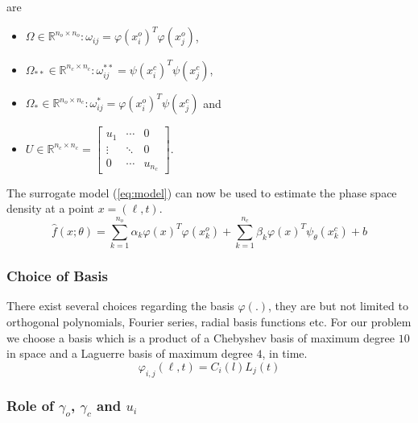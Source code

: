 are 
%
\begin{itemize}
\item $\Omega \in \mathbb{R}^{n_{o} \times n_{o}}: \omega_{ij} = \varphi(x^{o}_{i})^{T} \varphi(x^{o}_{j})$,
\item $\Omega_{**} \in \mathbb{R}^{n_{c} \times n_{c}}: \omega^{**}_{ij} = \psi(x^{c}_{i})^{T} \psi(x^{c}_{j})$,
\item $\Omega_{*} \in \mathbb{R}^{n_{o} \times n_{c}}: \omega^{*}_{ij} = \varphi(x^{o}_{i})^{T} \psi(x^{c}_{j})$ and 
\item $U \in \mathbb{R}^{n_{c} \times n_{c}} = \begin{bmatrix}
    u_1 & \cdots & 0 \\ 
    \vdots & \ddots  & 0\\ 
    0 & \cdots  & u_{n_{c}} 
  \end{bmatrix}$.
\end{itemize}
%
The surrogate model (\cref{eq:model}) can now be used to estimate the phase space density at a 
point $x = (\ell,t)$.
%
\begin{equation}\label{eq:model}
\hat{f}(x;\theta) = 
  \sum_{k = 1}^{n_{o}}{\alpha_{k}\varphi(x)^{T}\varphi(x^{o}_{k}) + 
  \sum_{k = 1}^{n_{c}}}{\beta_{k} \varphi(x)^{T} \psi_{\theta}(x^{c}_{k})} + b
\end{equation}

\subsubsection*{Choice of Basis}

There exist several choices regarding the basis $\varphi(.)$, they are but not limited to 
orthogonal polynomials, Fourier series, radial basis functions etc. For our problem we choose a 
basis which is a product of a Chebyshev basis of maximum degree $10$ in space and a Laguerre basis 
of maximum degree $4$, in time.
%
\begin{equation}\label{eq:basis}
\varphi_{i,j}(\ell,t) = C_{i}(l) L_{j}(t)
\end{equation}
%


\subsubsection*{Role of $\gamma_o$, $\gamma_c$ and $u_i$}

